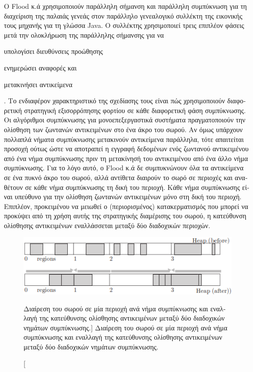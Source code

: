\begin{greek}
 Ο Flood κ.ά \cite{DBLP:conf/jvm/FloodDSZ01} χρησιμοποιούν παράλληλη
 σήμανση και παράλληλη συμπύκνωση για τη διαχείριση της παλαιάς
 γενεάς στον παράλληλο γενεαλογικό συλλέκτη της εικονικής τους
 μηχανής για τη γλώσσα Java. Ο συλλέκτης χρησιμοποιεί τρεις επιπλέον
 φάσεις μετά την ολοκλήρωση της παράλληλης σήμανσης για να
 \begin{inparaenum}[(i)]
 \item υπολογίσει διευθύνσεις προώθησης
 \item ενημερώσει αναφορές και
 \item μετακινήσει αντικείμενα
 \end{inparaenum}. Το ενδιαφέρον χαρακτηριστικό της σχεδίασης
 τους είναι πώς χρησιμοποιούν διαφορετική στρατηγική εξισορρόπησης
 φορτίου σε κάθε διαφορετική φάση συμπύκνωσης. Οι αλγόριθμοι
 συμπύκνωσης για μονοεπεξεργαστικά συστήματα πραγματοποιούν την
 ολίσθηση των ζωντανών αντικειμένων στο ένα άκρο του σωρού.
 Αν όμως υπάρχουν πολλαπλά νήματα συμπύκνωσης μετακινούν αντικείμενα
 παράλληλα, τότε απαιτείται προσοχή ούτως ώστε να αποτραπεί η
 εγγραφή δεδομένων ενός ζωντανού αντικειμένου από ένα νήμα
 συμπύκνωσης πριν τη μετακίνησή του αντικειμένου από ένα άλλο
 νήμα συμπύκνωσης. Για το λόγο αυτό, ο Flood κ.ά δε συμπυκνώνουν
 όλα τα αντικείμενα σε ένα πυκνό άκρο του σωρού, αλλά αντίθετα
 διαιρούν το σωρό σε περιοχές και αναθέτουν σε κάθε νήμα συμπύκνωσης
 τη δική του περιοχή. Κάθε νήμα συμπύκνωσης είναι υπεύθυνο για
 την ολίσθηση ζωντανών αντικειμένων μόνο στη δική του περιοχή.
 Επιπλέον, προκειμένου να μειωθεί ο (περιορισμένος) κατακερματισμός
 που μπορεί να προκύψει από τη χρήση αυτής της στρατηγικής
 διαμέρισης του σωρού, η κατεύθυνση ολίσθησης αντικειμένων
 εναλλάσσεται μεταξύ δύο διαδοχικών περιοχών. 

\begin{figure}[H]
  \centering
  \includegraphics{figures/par_5}
  \caption
    [Διαίρεση του σωρού σε μία περιοχή ανά νήμα συμπύκνωσης
     και εναλλαγή της κατεύθυνσης ολίσθησης αντικειμένων μεταξύ
     δύο διαδοχικών νημάτων συμπύκνωσης.]
    {Διαίρεση του σωρού σε μία περιοχή ανά νήμα συμπύκνωσης
     και εναλλαγή της κατεύθυνσης ολίσθησης αντικειμένων μεταξύ
     δύο διαδοχικών νημάτων συμπύκνωσης.}
  \label{fig:par_5}
\end{figure}


\end{greek}
